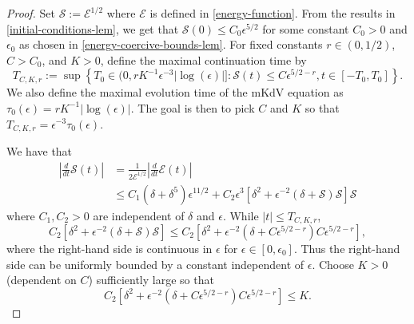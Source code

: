 \documentclass[oneside,reqno]{amsart}
\begin{document}
\begin{proof}
	
	Set \(\mathcal S := \mathcal E ^{1/2}\) where \(\mathcal E\) is defined in \cref{energy-function}. From the results in \cref{initial-conditions-lem}, we get that \(\mathcal S(0) \leq C_0 \epsilon^{5/2}\) for some constant \(C_0 > 0\) and \(\epsilon_0\) as chosen in \cref{energy-coercive-bounds-lem}. For fixed constants \(r\in(0,1/2)\), \(C> C_0\), and \(K > 0\), define the maximal continuation time by 
	\begin{equation*}
		T_{C,K,r} := \sup \left\{T_0 \in (0, r K^{-1} \epsilon^{-3} |\log(\epsilon)|]: \mathcal S(t) \leq C \epsilon^{5/2 -r}, t\in [-T_0, T_0]\right\}.
	\end{equation*} 
	We also define the maximal evolution time of the mKdV equation as \(\tau_0(\epsilon) = rK^{-1}|\log(\epsilon)|\). The goal is then to pick \(C\) and \(K\) so that \(T_{C,K,r} = \epsilon^{-3} \tau_0(\epsilon)\).
	
	We have that
	\begin{equation*}
		\begin{aligned}
			\left | \frac d {dt} \mathcal S(t) \right | &= \frac 1 {2 \mathcal E ^{1/2}} \left | \frac d {dt} \mathcal E(t) \right| \\
			&\leq C_1(\delta + \delta^5) \epsilon^{11/2} + C_2 \epsilon^3\left[ \delta^2 + \epsilon^{-2}(\delta + \mathcal S) \mathcal S \right]\mathcal S
		\end{aligned}
	\end{equation*}
	where \(C_1, C_2 > 0\) are independent of \(\delta\) and \(\epsilon\). While \(|t| \leq T_{C,K,r}\),
	\begin{equation*}
		C_2 \left[ \delta^2 + \epsilon^{-2}(\delta + \mathcal S) \mathcal S \right] \leq C_2 \left[ \delta^2  + \epsilon^{-2}(\delta +  C\epsilon^{5/2-r}) C \epsilon^{5/2-r} \right],
	\end{equation*}
	where the right-hand side is continuous in \(\epsilon \) for \(\epsilon \in [0,\epsilon_0]\). Thus the right-hand side can be uniformly bounded by a constant independent of \(\epsilon\). Choose \(K>0\) (dependent on \(C\)) sufficiently large so that 
	\begin{equation}\label{K-def}
		C_2 \left[ \delta^2  + \epsilon^{-2}(\delta +  C\epsilon^{5/2-r}) C \epsilon^{5/2-r} \right] \leq K.
	\end{equation}
	

\end{proof}
\end{document}
